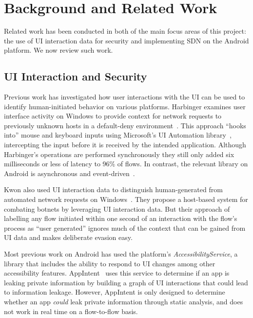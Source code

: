 \section{Background and Related Work}
\label{sec:related-work}

Related work has been conducted in both of the main focus areas of this project: the use of UI interaction data for security and implementing SDN on the Android platform. We now review such work.

\subsection{UI Interaction and Security}
\label{sec:ui-interaction-and-security}

Previous work has investigated how user interactions with the UI can be used to identify human-initiated behavior on various platforms. Harbinger examines user interface activity on Windows to provide context for network requests to previously unknown hosts in a default-deny environment~\cite{chuluundorj2019}. This approach ``hooks into'' mouse and keyboard inputs using Microsoft's UI Automation library~\cite{microsoft2018}, intercepting the input before it is received by the intended application. Although Harbinger's operations are performed synchronously they still only added six milliseconds or less of latency to 96\% of flows. In contrast, the relevant library on Android is asynchronous and event-driven~\cite{googledevelopers2020}.

Kwon \etal also used UI interaction data to distinguish human-generated from automated network requests on Windows~\cite{kwon2011}. They propose a host-based system for combating botnets by leveraging UI interaction data. But their approach of labelling any flow initiated within one second of an interaction with the flow's process as ``user generated'' ignores much of the context that can be gained from UI data and makes deliberate evasion easy.

Most previous work on Android has used the platform's \textit{AccessibilityService}, a library that includes the ability to respond to UI changes among other accessibility features. AppIntent~\cite{yang2013} uses this service to determine if an app is leaking private information by building a graph of UI interactions that could lead to information leakage. However, AppIntent is only designed to determine whether an app \textit{could} leak private information through static analysis, and does not work in real time on a flow-to-flow basis.


